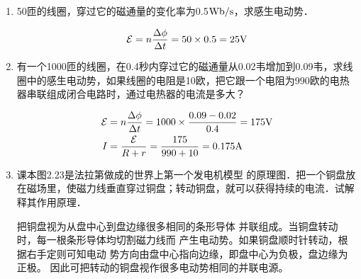 \begin{enumerate}
\item 50匝的线圈，穿过它的磁通量的变化率为0.5${\rm Wb}/{\rm s}$，求感生电动势．

\begin{solution}
    \[\mathcal{E}=n\frac{\Delta \phi}{\Delta t}=50\times 0.5=25{\rm V}\]
\end{solution}

\item 有一个1000匝的线圈，在0.4秒内穿过它的磁通量从0.02韦增加到0.09韦，求线圈中的感生电动势，如果线圈的电阻是10欧，把它跟一个电阻为990欧的电热器串联组成闭合电路时，通过电热器的电流是多大？

\begin{solution}
\[\begin{split}
    \mathcal{E}&=n\frac{\Delta \phi}{\Delta t}=1000\times \frac{0.09-0.02}{0.4}=175{\rm V}  \\
    I&=\frac{\mathcal{E}}{R+r}=\frac{175}{990+10}=0.175{\rm A}
\end{split}\]
\end{solution}

\item 课本图2.23是法拉第做成的世界上第一个发电机模型
的原理图．把一个铜盘放在磁场里，使磁力线垂直穿过铜盘；转动铜盘，就可以获得持续的电流．试解释其作用原理．

\begin{solution}
把铜盘视为从盘中心到盘边缘很多相同的条形导体
并联组成。当铜盘转动时，每一根条形导体均切割磁力线而
产生电动势。如果铜盘顺时针转动，根据右手定则可知电动
势方向由盘中心指向边缘，即盘中心为负极，盘边缘为正极。
因此可把转动的铜盘视作很多电动势相同的并联电源。
\end{solution}

\end{enumerate}




